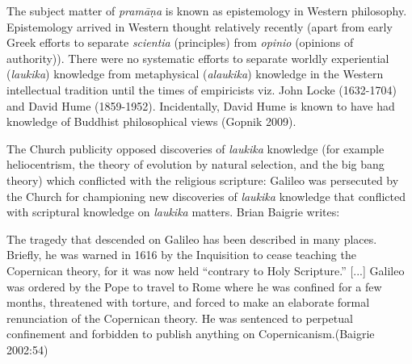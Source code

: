 The subject matter of {\sl pramāṇa} is known as epistemology in Western philosophy.  Epistemology arrived in Western thought relatively recently (apart from early Greek efforts to separate {\sl scientia} (principles) from {\sl opinio} (opinions of authority)). There were no systematic efforts to separate worldly experiential ({\sl laukika}) knowledge from metaphysical ({\sl alaukika}) knowledge in the Western intellectual tradition until the times of empiricists viz. John Locke (1632-1704) and David Hume (1859-1952).  Incidentally, David Hume is known to have had knowledge of Buddhist philosophical views (Gopnik 2009).

The Church publicity opposed discoveries of {\sl laukika} knowledge (for example heliocentrism, the theory of evolution by natural selection, and the big bang theory) which conflicted with the religious scripture: Galileo was persecuted by the Church for championing new discoveries of {\sl laukika} knowledge that conflicted with scriptural knowledge on {\sl laukika} matters.  Brian Baigrie writes:

\newpage

\begin{myquote}
The tragedy that descended on Galileo has been described in many places. Briefly, he was warned in 1616 by the Inquisition to cease teaching the Copernican theory, for it was now held ``contrary to Holy Scripture.'' [...] Galileo was ordered by the Pope to travel to Rome where he was confined for a few months, threatened with torture, and forced to make an elaborate formal renunciation of the Copernican theory.  He was sentenced to perpetual confinement and forbidden to publish anything on Copernicanism.\hfill (Baigrie 2002:54)\end{myquote}

